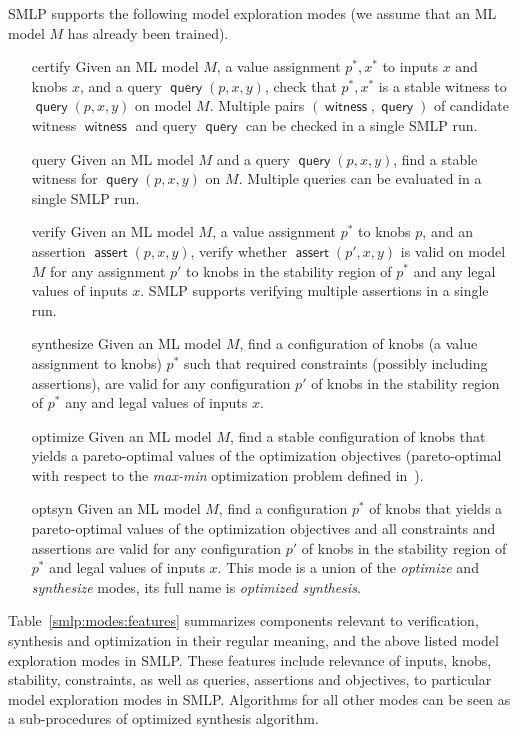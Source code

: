 \documentclass[a4paper,parskip=half]{article} %
\newcommand*\query{\operatorname{\mathsf{query}}}
\newcommand*\assert{\operatorname{\mathsf{assert}}}
\newcommand*\specval[1]{\operatorname{\mathsf{{#1}}}} %
\begin{document}
SMLP supports the following model exploration modes (we assume that an ML model $M$ has already been trained). 
\begin{itemize}
\item[certify] Given an ML model $M$, a value assignment $p^*,x^*$ to inputs $x$ and knobs $x$, and a query $\query(p,x,y)$,
check that $p^*,x^*$ is a stable witness to $\query(p,x,y)$ on model $M$. Multiple pairs $(\specval{witness},\query)$ 
of candidate witness $\specval{witness}$ and query $\query$ can be checked in a single SMLP run.
\item[query] Given an ML model $M$  and a query $\query(p,x,y)$, find a stable witness for $\query(p,x,y)$ on $M$.
Multiple queries can be evaluated in a single SMLP run.
\item[verify] Given an ML model $M$,  a value assignment $p^*$ to knobs $p$,  and an assertion $\assert(p,x,y)$, verify whether  
$\assert(p',x,y)$ is valid on model $M$ for any assignment $p'$ to knobs in the stability region of $p^*$ and any
legal values of inputs $x$.  SMLP supports verifying multiple assertions in a single run.
\item[synthesize] Given an ML model $M$,  find a configuration of knobs (a value assignment to knobs) $p^*$
such that required constraints (possibly including assertions),  are valid for any configuration $p'$ of knobs in the 
stability region of $p^*$ any and legal values of inputs $x$.
\item[optimize]  Given an ML model $M$,  find a stable configuration of knobs that yields a pareto-optimal values of 
the optimization objectives (pareto-optimal with respect to the \emph{max-min} optimization problem defined 
in~\cite{brausse2024smlp}).
\item[optsyn] Given an ML model $M$,  find a configuration $p^*$ of knobs that yields a pareto-optimal values of the 
optimization objectives and all constraints and assertions are valid for any configuration $p'$ of knobs in the 
stability region of $p^*$  and legal values of inputs $x$. This mode is a union 
of the \emph{optimize} and \emph{synthesize} modes, its full name is \emph{optimized synthesis}. 

\end{itemize}


Table~\ref{smlp:modes:features} summarizes components relevant to verification, synthesis and optimization
in their regular meaning,  and the above listed model exploration modes in SMLP. These features include
relevance of inputs, knobs, stability, constraints, as well as  queries, assertions and objectives,
to particular model exploration modes in SMLP. 
Algorithms for all other modes can be seen as a sub-procedures of optimized synthesis algorithm.
\end{document}
